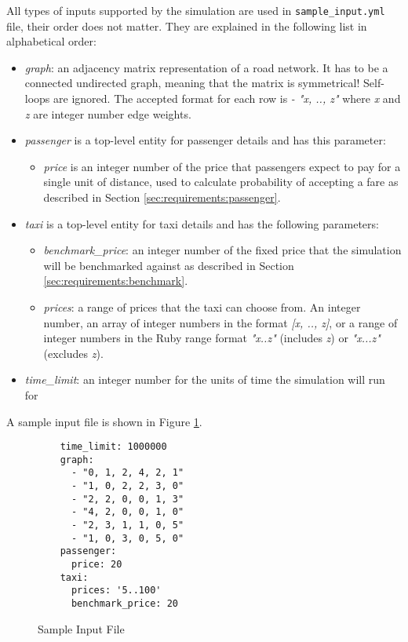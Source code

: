 
All types of inputs supported by the simulation are used in
\texttt{sample\_input.yml} file, their order does not matter. They are explained
in the following list in alphabetical order:

\begin{itemize}
  \item \textit{graph}: an adjacency matrix representation of a road network.
        It has to be a connected undirected graph, meaning that the matrix is
        symmetrical! Self-loops are ignored. The accepted format for each row
        is \textit{- "x, .., z"} where \textit{x} and \textit{z} are integer
        number edge weights.
  \item \textit{passenger} is a top-level entity for passenger details and has
        this parameter:
        \begin{itemize} 
          \item \textit{price} is an integer number of the price that
                passengers expect to pay for a single unit of distance, used to
                calculate probability of accepting a fare as described in
                Section \ref{sec:requirements:passenger}.
        \end{itemize}
  \item \textit{taxi} is a top-level entity for taxi details and has the
        following parameters:
        \begin{itemize}
          \item \textit{benchmark\_price}: an integer number of the fixed price
          that the simulation will be benchmarked against as described in
          Section \ref{sec:requirements:benchmark}.
          \item \textit{prices}: a range of prices that the taxi can choose
          from. An integer number, an array of integer numbers in the format 
          \textit{[x, .., z]}, or a range of integer numbers in the Ruby range
          format \textit{"x..z"} (includes \textit{z}) or \textit{"x...z"}
          (excludes \textit{z}).
        \end{itemize}
  \item \textit{time\_limit}: an integer number for the units of time the
        simulation will run for
\end{itemize}

A sample input file is shown in Figure \ref{figure:input}.

\begin{figure}
  \begin{verbatim}
    time_limit: 1000000
    graph:
      - "0, 1, 2, 4, 2, 1"
      - "1, 0, 2, 2, 3, 0"
      - "2, 2, 0, 0, 1, 3"
      - "4, 2, 0, 0, 1, 0"
      - "2, 3, 1, 1, 0, 5"
      - "1, 0, 3, 0, 5, 0"
    passenger:
      price: 20
    taxi:
      prices: '5..100'
      benchmark_price: 20
  \end{verbatim}
\caption{
  Sample Input File
  \label{figure:input}
}
\end{figure}


